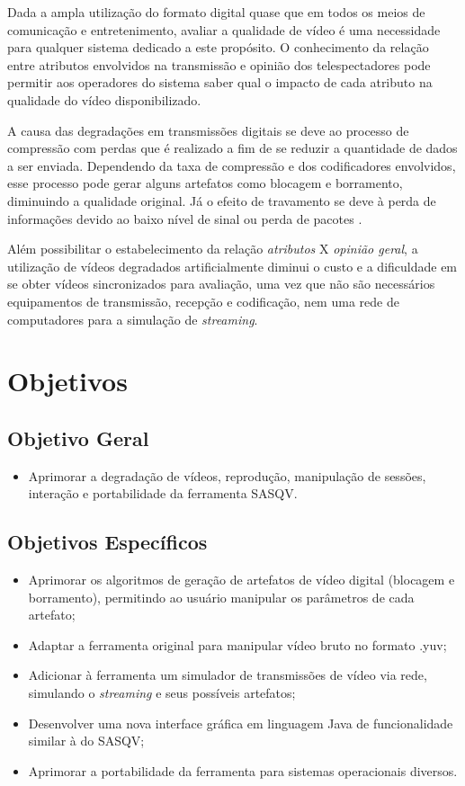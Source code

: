 Dada a ampla utilização do formato digital quase que em todos os meios de comunicação e entretenimento, avaliar a qualidade de vídeo é uma necessidade para qualquer sistema dedicado a este propósito. O conhecimento da relação entre atributos envolvidos na transmissão e opinião dos telespectadores pode permitir aos operadores do sistema saber qual o impacto de cada atributo na qualidade do vídeo disponibilizado.

A causa das degradações em transmissões digitais se deve ao processo de compressão com perdas que é realizado a fim de se reduzir a quantidade de dados a ser enviada. Dependendo da taxa de compressão e dos codificadores envolvidos, esse processo pode gerar alguns artefatos como blocagem e borramento, diminuindo a qualidade original. Já o efeito de travamento se deve à perda de informações devido ao baixo nível de sinal ou perda de pacotes \cite{albini}.

Além possibilitar o estabelecimento da relação \emph{atributos} X \emph{opinião geral}, a utilização de vídeos degradados artificialmente diminui o custo e a dificuldade em se obter vídeos sincronizados para avaliação, uma vez que não são necessários equipamentos de transmissão, recepção e codificação, nem uma rede de computadores para a simulação de \emph{streaming}.

\section{Objetivos}
\subsection{Objetivo Geral}

\begin{itemize}
    \item Aprimorar a degradação de vídeos, reprodução, manipulação de sessões, interação e portabilidade da ferramenta SASQV.
\end{itemize}

\subsection{Objetivos Específicos}

\begin{itemize}
    \item Aprimorar os algoritmos de geração de artefatos de vídeo digital (blocagem e borramento), permitindo ao usuário manipular os parâmetros de cada artefato;
    \item Adaptar a ferramenta original para manipular vídeo bruto no formato .yuv;
    \item Adicionar à ferramenta um simulador de transmissões de vídeo via rede, simulando o \emph{streaming} e seus possíveis artefatos;
    \item Desenvolver uma nova interface gráfica em linguagem Java de funcionalidade similar à do SASQV;
    \item Aprimorar a portabilidade da ferramenta para sistemas operacionais diversos.
\end{itemize}

